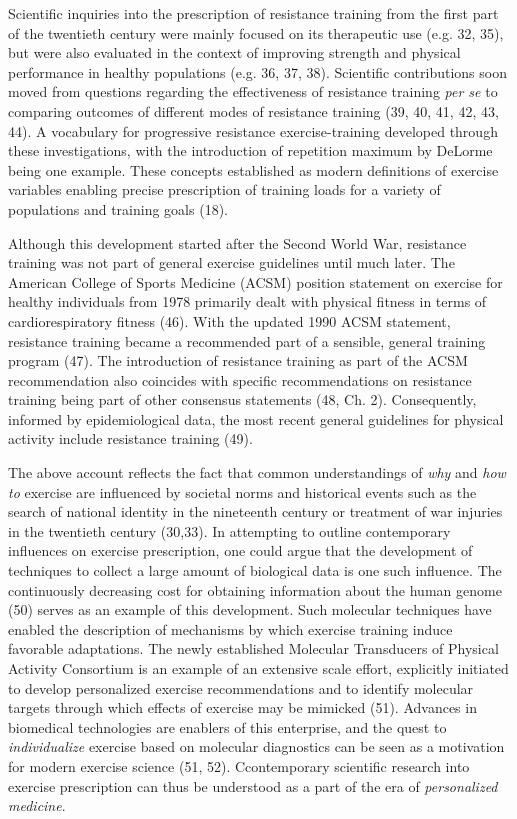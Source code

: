 \documentclass[twoside,10pt]{gihclass} %
\begin{document}
Scientific inquiries into the prescription of resistance training from the first part of the twentieth century were mainly focused on its therapeutic use
(e.g. 32, 35),
but were also evaluated in the context of improving strength and physical performance in healthy populations
(e.g. 36, 37, 38).
Scientific contributions soon moved from questions regarding the effectiveness of resistance training \emph{per se} to comparing outcomes of different modes of resistance training
(39, 40, 41, 42, 43, 44).
A vocabulary for progressive resistance exercise-training developed through these investigations, with
the introduction of repetition maximum by DeLorme being one example. These concepts established as modern definitions of exercise variables enabling precise prescription of training loads for a variety of populations and training goals
(18).

Although this development started after the Second World War, resistance training was not part of general exercise guidelines until much later.
The American College of Sports Medicine (ACSM) position statement on exercise for healthy individuals from 1978 primarily dealt with physical fitness in terms of cardiorespiratory fitness
(46).
With the updated 1990 ACSM statement, resistance training became a recommended part of a sensible, general training program
(47).
The introduction of resistance training as part of the ACSM recommendation also coincides with specific recommendations on resistance training being part of other consensus statements
(48, Ch. 2).
Consequently, informed by epidemiological data, the most recent general guidelines for physical activity include resistance training (49).

The above account reflects the fact that common understandings of \emph{why} and \emph{how to} exercise are influenced by societal norms and historical events such as the search of national identity in the nineteenth century or treatment of war injuries in the twentieth century
(30,33).
In attempting to outline contemporary influences on exercise prescription, one could argue that the development of techniques to collect a large amount of biological data is one such influence. The continuously decreasing cost for obtaining information about the human genome
(50) serves as an example of this development.
Such molecular techniques have enabled the description of mechanisms by which exercise training induce favorable adaptations. The newly established Molecular Transducers of Physical Activity Consortium is an example of an extensive scale effort, explicitly initiated to develop personalized exercise recommendations and to identify molecular targets through which effects of exercise may be mimicked
(51).
Advances in biomedical technologies are enablers of this enterprise, and the quest to \emph{individualize} exercise based on molecular diagnostics can be seen as a motivation for modern exercise science
(51, 52).
Ccontemporary scientific research into exercise prescription can thus be understood as a part of the era of \emph{personalized medicine}.
\end{document}
